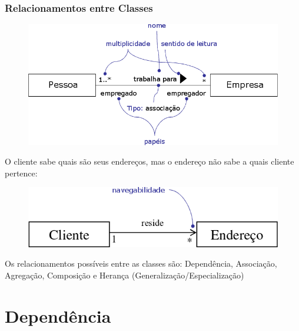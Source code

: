 \documentclass[aspectratio=169]{beamer}
\begin{document}
\begin{frame}\frametitle{Relacionamentos entre Classes}
\begin{figure}[h]
	\centering
	\includegraphics[height=0.32\paperheight]{imagens/relacionamento1.png}
	\end{figure}
\begin{itemize}
	{\small
	\item O cliente sabe quais são seus endereços, mas o endereço não sabe a quais cliente pertence:
		\centering
	\begin{figure}[h]
		\includegraphics[height=0.12\paperheight]{imagens/relacionamento2.png}
	\end{figure}
	\item Os relacionamentos possíveis entre as classes são: Dependência, Associação, Agregação, Composição e Herança (Generalização/Especialização)
	}
\end{itemize}
\end{frame}

\section{Dependência}
\end{document}
